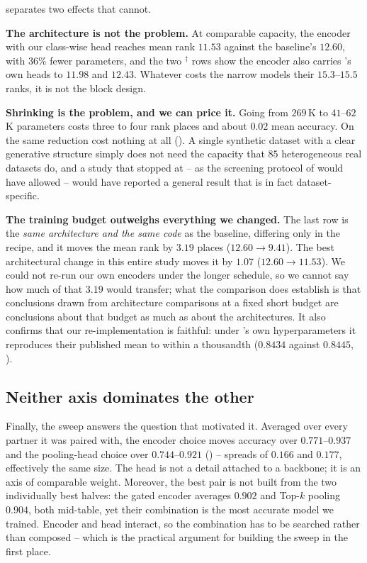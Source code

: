  separates two effects that  cannot.

\textbf{The architecture is not the problem.} At comparable capacity, the \seanet{} encoder with our
class-wise head reaches mean rank $11.53$ against the baseline's $12.60$, with $36\%$ fewer
parameters, and the two $^{\dagger}$ rows show the encoder also carries \millet{}'s own heads to
$11.98$ and $12.43$. Whatever costs the narrow models their $15.3$--$15.5$ ranks, it is not the block
design.

\textbf{Shrinking is the problem, and we can price it.} Going from $269$\,K to $41$--$62$\,K
parameters costs three to four rank places and about $0.02$ mean accuracy. On \webtraffic{} the same
reduction cost nothing at all (). A single synthetic dataset with a clear
generative structure simply does not need the capacity that $85$ heterogeneous real datasets do, and
a study that stopped at \webtraffic{} -- as the screening protocol of  would have
allowed -- would have reported a general result that is in fact dataset-specific.

\textbf{The training budget outweighs everything we changed.} The last row is the \emph{same
architecture and the same code} as the baseline, differing only in the recipe, and it moves the mean
rank by $3.19$ places ($12.60 \to 9.41$). The best architectural change in this entire study moves it
by $1.07$ ($12.60 \to 11.53$). We could not re-run our own encoders under the longer schedule, so we
cannot say how much of that $3.19$ would transfer; what the comparison does establish is that
conclusions drawn from architecture comparisons at a fixed short budget are conclusions about that
budget as much as about the architectures. It also confirms that our re-implementation is faithful:
under \millet{}'s own hyperparameters it reproduces their published \ucr{} mean to within a
thousandth ($0.8434$ against $0.8445$, ).

\subsection{Neither axis dominates the other}
\label{sec:cheap:axes}

Finally, the sweep answers the question that motivated it. Averaged over every partner it was paired
with, the encoder choice moves \webtraffic{} accuracy over $0.771$--$0.937$ and the pooling-head
choice over $0.744$--$0.921$ () -- spreads of $0.166$ and $0.177$, effectively
the same size. The head is not a detail attached to a backbone; it is an axis of comparable weight.
Moreover, the best pair is not built from the two individually best halves: the gated encoder
averages $0.902$ and Top-$k$ pooling $0.904$, both mid-table, yet their combination is the most
accurate model we trained. Encoder and head interact, so the combination has to be searched rather
than composed -- which is the practical argument for building the sweep in the first place.
